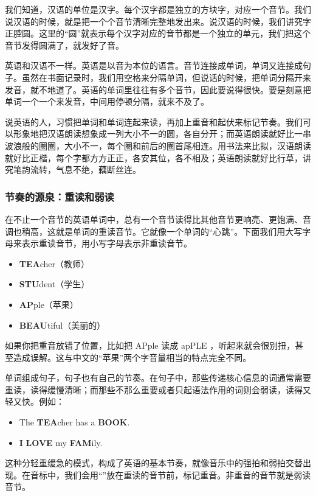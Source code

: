 \documentclass[10.5pt, a4paper]{ctexbook} %
\begin{document}
我们知道，汉语的单位是汉字。每个汉字都是独立的方块字，对应一个音节。我们说汉语的时候，就是把一个个音节清晰完整地发出来。说汉语的时候，我们讲究字正腔圆。这里的“圆”就表示每个汉字对应的音节都是一个独立的单元，我们把这个音节发得圆满了，就发好了音。

英语和汉语不一样。英语是以音为本位的语言。音节连接成单词，单词又连接成句子。虽然在书面记录时，我们用空格来分隔单词，但说话的时候，把单词分隔开来发音，就不地道了。英语的单词里往往有多个音节，因此要说得很快。要是刻意把单词一个一个来发音，中间用停顿分隔，就来不及了。

说英语的人，习惯把单词和单词连起来读，再加上重音和起伏来标记节奏。我们可以形象地把汉语朗读想象成一列大小不一的圆，各自分开；而英语朗读就好比一串波浪般的圈圈，大小不一，每个圈和前后的圈首尾相连。用书法来比拟，汉语朗读就好比正楷，每个字都方方正正，各安其位，各不相及；英语朗读就好比行草，讲究笔韵流转，气息不绝，藕断丝连。

\subsubsection*{节奏的源泉：重读和弱读}

在不止一个音节的英语单词中，总有一个音节读得比其他音节更响亮、更饱满、音调也稍高，这就是单词的重读音节。它就像一个单词的“心跳”。下面我们用大写字母来表示重读音节，用小写字母表示非重读音节。

\begin{itemize}
    \item \textbf{TEA}cher（教师）
    \item \textbf{STU}dent（学生）
    \item \textbf{AP}ple（苹果）
    \item \textbf{BEAU}tiful（美丽的）
\end{itemize}

如果你把重音放错了位置，比如把 APple 读成 apPLE ，听起来就会很别扭，甚至造成误解。这与中文的“苹果”两个字音量相当的特点完全不同。

单词组成句子，句子也有自己的节奏。在句子中，那些传递核心信息的词通常需要重读，读得缓慢清晰；而那些不那么重要或者只起语法作用的词则会弱读，读得又轻又快。例如：
\begin{itemize}
    \item The \textbf{TEA}cher has a \textbf{BOOK}.
    \item \textbf{I} \textbf{LOVE} my \textbf{FAM}ily.
\end{itemize}

这种分轻重缓急的模式，构成了英语的基本节奏，就像音乐中的强拍和弱拍交替出现。在音标中，我们会用“”放在重读的音节前，标记重音。非重音的音节就是弱读音节。
\end{document}
